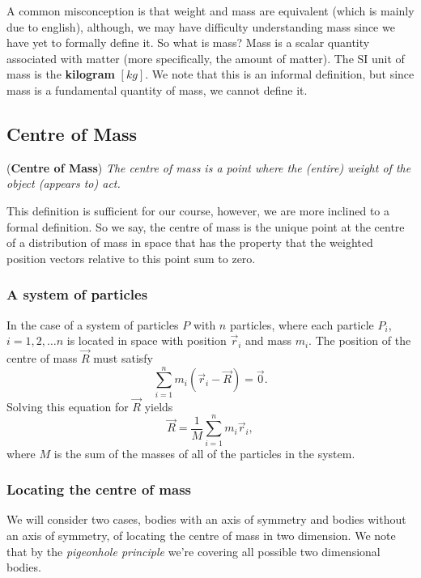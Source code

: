 A common misconception is that weight and mass are equivalent (which is mainly due to english), although, we may have difficulty understanding mass since we have yet to formally define it. So what is mass? Mass is a scalar quantity associated with matter (more specifically, the amount of matter). The SI unit of mass is the \textbf{kilogram} $[kg]$. We note that this is an informal definition, but since mass is a fundamental quantity of mass, we cannot define it. 

\subsection{Centre of Mass}

\begin{definition}{(\textbf{Centre of Mass})}
\textit{The centre of mass is a point where the (entire) weight of the object (appears to) act.}
\end{definition} 

This definition is sufficient for our course, however, we are more inclined to a formal definition. So we say, the centre of mass is the unique point at the centre of a distribution of mass in space that has the property that the weighted position vectors relative to this point sum to zero. 

\subsubsection{A system of particles}

In the case of a system of particles $P$ with $n$ particles, where each particle $P_i$, $i = 1, 2, \ldots n$ is located in space with position $\vec{r}_i$ and mass $m_i$. The position of the centre of mass $\vec{R}$ must satisfy 
\begin{equation*}
    \sum_{i = 1}^n m_i (\vec{r}_i - \vec{R}) = \vec{0}.
\end{equation*}
Solving this equation for $\vec{R}$ yields
\begin{equation}
    \vec{R} = \frac{1}{M} \sum_{i=1}^n m_i \vec{r}_i,
\end{equation}
where $M$ is the sum of the masses of all of the particles in the system. 

\subsubsection{Locating the centre of mass}

We will consider two cases, bodies with an axis of symmetry and bodies without an axis of symmetry, of locating the centre of mass in two dimension. We note that by the \textit{pigeonhole principle} we're covering all possible two dimensional bodies.


